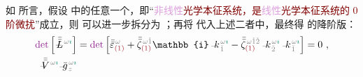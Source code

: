 如  所言，假设  中的任意一个，即“\textcolor{Maroon}{\textcolor{Plum}{非线性}光学本征系统，是\textcolor{Plum}{线性}光学本征系统的 \textcolor{NavyBlue}{0 阶微扰}}”成立，则  可以进一步拆分为 ；再将  代入上述二者中，最终得  的降阶版：
\begin{subequations} \label{eq:nonlinear(2)-wave_wkrho-simplify6'}
\begin{align}
	\textcolor{Plum}{\det} \left[ \Xint{\mathcolor{gray}{-}}{32}{\bar{\bar{L}}}^{\;\! \mathcolor{gray}{\omega} \textcolor{PineGreen}{\imath}} \right] &= \textcolor{Plum}{\det} \left[ \bar{\bar{\varepsilon}}^{\;\! \mathcolor{gray}{\omega}}_{\textcolor{Maroon}{(1)}} + \bar{\bar{\zeta}}^{\;\! \mathcolor{gray}{\omega} \mathcolor{gray}{\check{1}}}_{\textcolor{Maroon}{(1)}} \mathbb{i} \Xint{\begin{smallmatrix} ~ \\ {}^{}_{\mathcolor{gray}{-}} \\ ~ \end{smallmatrix}}{15}{k}_{\;\! \mathcolor{gray}{\check{1}}}^{\;\! \mathcolor{gray}{\omega} \textcolor{PineGreen}{\imath}} - \bar{\bar{\zeta}}^{\;\! \mathcolor{gray}{\omega} \mathcolor{gray}{\check{1} \check{2}}}_{\textcolor{Maroon}{(1)}} \Xint{\begin{smallmatrix} ~ \\ {}^{}_{\mathcolor{gray}{-}} \\ ~ \end{smallmatrix}}{15}{k}_{\;\! \mathcolor{gray}{\check{2}}}^{\;\! \mathcolor{gray}{\omega} \textcolor{PineGreen}{\imath}} \Xint{\begin{smallmatrix} ~ \\ {}^{}_{\mathcolor{gray}{-}} \\ ~ \end{smallmatrix}}{15}{k}_{\;\! \mathcolor{gray}{\check{1}}}^{\;\! \mathcolor{gray}{\omega} \textcolor{PineGreen}{\imath}} \right] = 0 ~, \label{eq:nonlinear(2)-wave_wkrho-simplify6-L3'} \\
	\Xint{\mathcolor{gray}{-}}{25}{\bar{\bar{V}}}^{\;\! \mathcolor{gray}{\omega} \textcolor{PineGreen}{\imath}} \Xint{{}^{}_{\mathcolor{gray}{-}}}{10}{\bar{g}}^{\;\!\mathcolor{gray}{\omega} \textcolor{PineGreen}{\imath}}_{\;\! \mathcolor{gray}{z}}

\end{align}
\end{subequations}
